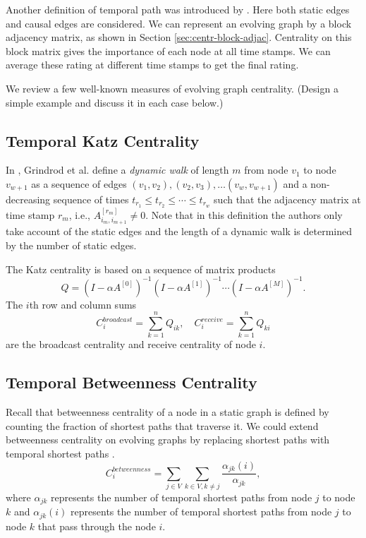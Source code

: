 \documentclass[12pt]{article}
\theoremstyle{definition}
\begin{document}
Another definition of temporal path was introduced by \cite{chen16}. Here
both static edges and causal edges are considered. We can represent an evolving graph by a block adjacency matrix, as shown in Section \ref{sec:centr-block-adjac}. Centrality on this block matrix gives the importance of each node at all time stamps. We can average these rating at different time stamps to
get the final rating.


We review a few well-known measures of evolving graph centrality.
(Design a simple example and discuss it in each case below.)
\subsection{Temporal Katz Centrality}
\label{sec:temp-katz-centr}

In \cite{grindrod11}, Grindrod et al. define a \emph{dynamic walk} of length $m$ from
node $v_1$ to node $v_{w+1}$  as a sequence of edges
$(v_1, v_2), (v_2, v_3), \ldots (v_w, v_{w+1})$ and a non-decreasing sequence of times
$t_{r_1} \leq t_{r_2} \leq \cdots \leq t_{r_w}$ such that the adjacency matrix at time stamp
$r_m$, i.e., $A_{i_m, i_{m+1}}^{[r_m]} \ne 0$. Note that in this definition the authors only take account of the static edges and the length of a dynamic walk is determined by the number of static edges.

The Katz centrality is based on a sequence of matrix products
\begin{equation}
\label{eq:katz}
Q = (I - \alpha A^{[0]})^{-1}(I - \alpha A^{[1]})^{-1} \cdots (I - \alpha A^{[M]})^{-1}.
\end{equation}
The $i$th row and column sums
$$
C_i^{broadcast} = \sum_{k=1}^n Q_{ik}, \quad C_i^{receive} = \sum_{k=1}^n Q_{ki}
$$
are the broadcast centrality and receive centrality of node $i$.

\subsection{Temporal Betweenness Centrality}
\label{sec:temp-betw-centr}

Recall that betweenness centrality of a node in a static graph is defined by counting the fraction of shortest paths that traverse it.
We could extend
betweenness centrality on evolving graphs by replacing shortest paths with temporal shortest paths \cite{nicosia13}.
\begin{equation}
  \label{eq:bet1}
C_i^{betweenness} = \sum_{j \in V}\sum_{k \in V, k \ne j}\frac{\alpha_{jk}(i)}{\alpha_{jk}},
\end{equation}
where $\alpha_{jk}$ represents the number of temporal shortest paths from node $j$ to node $k$ and $\alpha_{jk}(i)$ represents the number of temporal shortest paths from node $j$ to node $k$ that pass through the node $i$.
\end{document}
